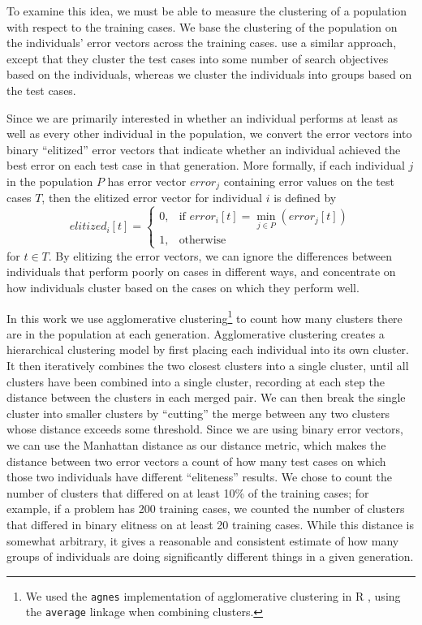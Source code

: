 To examine this idea, we must be able to measure the clustering of a population with respect to the training cases. We base the clustering of the population on the individuals' error vectors across the training cases. \cite{Krawiec:2015:EuroGP} use a similar approach, except that they cluster the test cases into some number of search objectives based on the individuals, whereas we cluster the individuals into groups based on the test cases.

Since we are primarily interested in whether an individual performs at least as well as every other 
individual in the population, we convert the error vectors into binary ``elitized'' error vectors 
that indicate whether an individual achieved the best error on each test case in that generation. 
More formally, if each individual $j$ in the population $P$ has error vector $\mathit{error}_j$ containing error values on the test cases $T$, then the elitized error vector for individual $i$ is defined by
\[
\mathit{elitized}_i[t] =
\begin{cases}
    0,         & \text{if } \mathit{error}_i[t] = \min\limits_{j \in P} (\mathit{error}_j[t])  \\
    1,         & \text{otherwise}
\end{cases}
\]
for $t \in T$.
By elitizing the error vectors, we can ignore the differences between individuals that perform poorly on cases in different 
ways, and concentrate on how individuals cluster based on the cases on which they perform well.

In this work we use agglomerative clustering\footnote{We used the \texttt{agnes} \citep{cluster} implementation of 
	agglomerative clustering in R \citep{R}, using the \texttt{average} linkage when 
	combining clusters.} to count how many clusters there are in the population 
at each generation. Agglomerative clustering creates 
a hierarchical clustering model by first placing each individual into its own cluster. It then 
iteratively combines the two closest clusters into a single cluster, until all clusters have been 
combined into a single cluster, recording at each step the distance between the clusters in each merged pair. 
We can then break the single cluster into smaller clusters by
``cutting'' the merge between any two clusters whose distance exceeds some threshold.
Since we are using binary error vectors, we can use the 
Manhattan distance as our distance metric, which makes the distance between two error vectors
a count of how many test cases on which those two individuals have different ``eliteness'' 
results.
We chose to count the number of clusters that differed on at least 10\% of the training cases; 
for example, if a problem has 200 training cases, we counted the number of clusters that differed 
in binary elitness on at least 20 training cases. While this distance is somewhat arbitrary, 
it gives a reasonable and consistent estimate of how many groups of individuals are doing 
significantly different things in a given generation.

